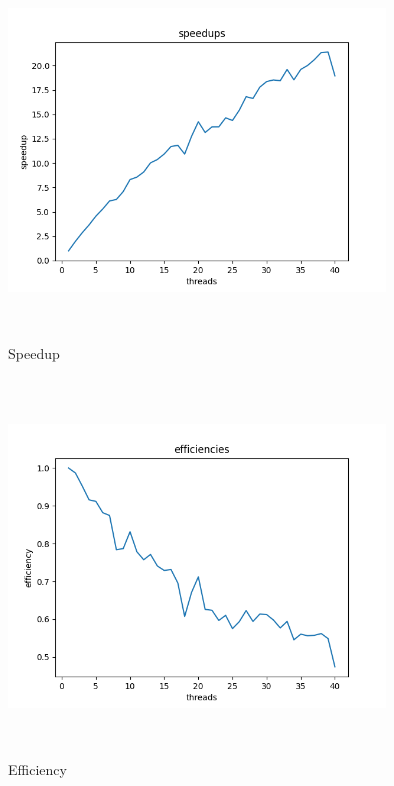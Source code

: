 \documentclass{article}
\begin{document}
\begin{figure}[H]
	\centering
	\includegraphics[width=10cm,height=10cm,keepaspectratio]{data/jolteon-plot-speedup.png}
	\caption{Speedup}
\end{figure}
\begin{figure}[H]
	\centering
	\includegraphics[width=10cm,height=10cm,keepaspectratio]{data/jolteon-plot-efficiency.png}
	\caption{Efficiency}
\end{figure}

\end{document}
